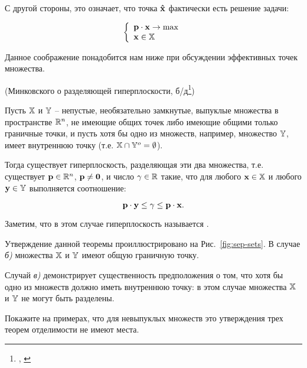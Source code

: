 \begin{note}
С другой стороны, это означает, что точка $\mathbf{\hat x}$ фактически
есть решение задачи:

\[
\left\{ \begin{array}{l}
 \mathbf{p} \cdot \mathbf{x} \rightarrow \max\\
 \mathbf{x} \in \mathbb{X} \\
 \end{array} \right.
\]

Данное соображение понадобится нам ниже при обсуждении эффективных
точек множества.
\end{note}



\begin{teo}\label{teo:sep_hplane_Mink}(Минковского о
разделяющей гиперплоскости, б/д\/\footnote{\cite{Takayama:1985},
\cite{Braverman:1976}})

Пусть $\mathbb{X}$ и $\mathbb{Y}$ -- непустые, необязательно замкнутые,
выпуклые множества в пространстве $\mathbb{R}^n$, не имеющие общих точек
либо имеющие общими только граничные точки, и пусть хотя бы одно из
множеств, например, множество $\mathbb{Y}$, имеет внутреннюю точку (т.е.
$\mathbb{X} \cap \mathbb{Y}^o = \emptyset$).

Тогда существует гиперплоскость, разделяющая эти два множества, т.е.
существует $\mathbf{p} \in \mathbb{R}^n$, $\mathbf{p} \neq \mathbf{0}$, и число $\gamma
\in \mathbb{R}$ такие, что для любого $\mathbf{x} \in \mathbb{X}$ и любого $\mathbf{y}
\in \mathbb{Y}$ выполняется соотношение:

\[
\mathbf{p} \cdot \mathbf{y} \leq \gamma \leq \mathbf{p} \cdot \mathbf{x}.
\]
\end{teo}



Заметим, что в этом случае гиперплоскость называется
.

Утверждение данной теоремы проиллюстрировано на
Рис.~\ref{fig:sep-sets}. В случае \emph{б)} множества $\mathbb{X}$ и
$\mathbb{Y}$ имеют общую граничную точку.


Случай \emph{в)} демонстрирует существенность предположения о том,
что хотя бы одно из множеств должно иметь внутреннюю точку: в этом
случае множества $\mathbb{X}$ и $\mathbb{Y}$ не могут быть разделены.

\begin{exer}
Покажите на примерах, что для невыпуклых множеств это утверждения
трех теорем отделимости не имеют места.
\end{exer}


